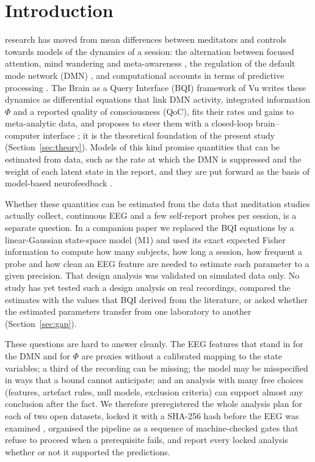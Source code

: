 \section{Introduction}
\label{sec:intro}
 research has moved from mean differences between meditators and controls towards models of the dynamics of a session: the alternation between focused attention, mind wandering and meta-awareness \cite{Hasenkamp2012,Lutz2008,Christoff2016}, the regulation of the default mode network (DMN) \cite{Raichle2001,Brewer2011,Garrison2015}, and computational accounts in terms of predictive processing \cite{Laukkonen2021,SandvedSmith2021}. The Brain as a Query Interface (BQI) framework of Vu \cite{BQI} writes these dynamics as differential equations that link DMN activity, integrated information $\Phi$ and a reported quality of consciousness (QoC), fits their rates and gains to meta-analytic data, and proposes to steer them with a closed-loop brain--computer interface \cite[Sec.~7.2, 9.3 and 10.1]{BQI}; it is the theoretical foundation of the present study (Section~\ref{sec:theory}). Models of this kind promise quantities that can be estimated from data, such as the rate at which the DMN is suppressed and the weight of each latent state in the report, and they are put forward as the basis of model-based neurofeedback \cite{Sitaram2017}.

Whether these quantities can be estimated from the data that meditation studies actually collect, continuous EEG and a few self-report probes per session, is a separate question. In a companion paper \cite{companion} we replaced the BQI equations by a linear-Gaussian state-space model (M1) and used its exact expected Fisher information to compute how many subjects, how long a session, how frequent a probe and how clean an EEG feature are needed to estimate each parameter to a given precision. That design analysis was validated on simulated data only. No study has yet tested such a design analysis on real recordings, compared the estimates with the values that BQI derived from the literature, or asked whether the estimated parameters transfer from one laboratory to another (Section~\ref{sec:gap}).

These questions are hard to answer cleanly. The EEG features that stand in for the DMN and for $\Phi$ are proxies without a calibrated mapping to the state variables; a third of the recording can be missing; the model may be misspecified in ways that a bound cannot anticipate; and an analysis with many free choices (features, artefact rules, null models, exclusion criteria) can support almost any conclusion after the fact. We therefore preregistered the whole analysis plan for each of two open datasets, locked it with a SHA-256 hash before the EEG was examined \cite{Nosek2018}, organised the pipeline as a sequence of machine-checked gates that refuse to proceed when a prerequisite fails, and report every locked analysis whether or not it supported the predictions.

